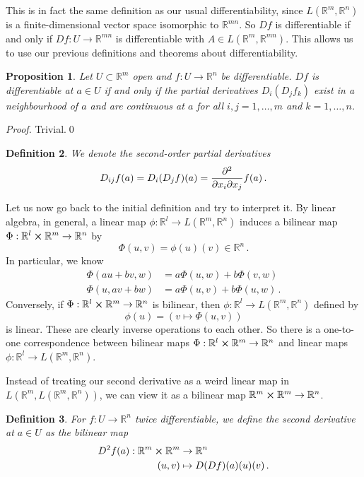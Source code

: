\documentclass{article}
\theoremstyle{plain}\theoremheaderfont{\normalfont\itshape}\theorembodyfont{\rmfamily}\theoremseparator{.}\newtheorem*{rem}{Remark}\newtheorem*{ex}{Example}\newtheorem*{proof}{Proof}\newtheorem*{altp}{Alternative proof}
\theoremstyle{plain}\theoremheaderfont{\normalfont\bfseries}\theorembodyfont{\rmfamily}\theoremseparator{.}\newtheorem{thm}{Theorem}[section]\newtheorem{lem}[thm]{Lemma}\newtheorem{prop}[thm]{Proposition}\newtheorem*{cor}{Corollary}\newtheorem{defn}[thm]{Definition}\newtheorem{clm}[thm]{Claim}\newtheorem{clminproof}{Claim}
\theoremstyle{break}\theoremheaderfont{\normalfont\itshape}\theorembodyfont{\rmfamily}\theoremseparator{.\medskip}\newtheorem*{proofskip}{Proof}\newtheorem*{exs}{Examples}\newtheorem*{rems}{Remarks}
\theoremstyle{break}\theoremheaderfont{\normalfont\bfseries}\theorembodyfont{\rmfamily}\theoremseparator{.\medskip}\newtheorem{lemskip}[thm]{Lemma}\newtheorem{defnskip}[thm]{Definition}\newtheorem{propskip}[thm]{Proposition}\newtheorem{thmskip}[thm]{Theorem}
\newcommand{\qed}{\hfill\ensuremath{\Box}}
\begin{document}
    This is in fact the same definition as our usual differentiability, since \(L(\mathbb{R}^m,\mathbb{R}^n)\) is a finite-dimensional vector space isomorphic to \(\mathbb{R}^{mn}\). So \(Df\) is differentiable if and only if \(Df:U\to\mathbb{R}^{mn}\) is differentiable with \(A\in L(\mathbb{R}^m,\mathbb{R}^{mn})\). This allows us to use our previous definitions and theorems about differentiability.

    \begin{prop}
        Let \(U\subset\mathbb{R}^m\) open and \(f:U\to\mathbb{R}^n\) be differentiable. \(Df\) is differentiable at \(a\in U\) if and only if the partial derivatives \(D_i(D_jf_k)\) exist in a neighbourhood of \(a\) and are continuous at \(a\) for all \(i,j=1,\dots,m\) and \(k=1,\dots,n\).
    \end{prop}
    \begin{proof}
        Trivial.\qed
    \end{proof}
    \begin{defn}
        We denote the \textit{second-order partial derivatives}
        \[D_{ij}f(a)=D_i(D_j f)(a)=\pdv[2]{}{x_i}{x_j} f(a)\,.\]
    \end{defn}

    Let us now go back to the initial definition and try to interpret it. By linear algebra, in general, a linear map \(\phi:\mathbb{R}^l\to L(\mathbb{R}^m,\mathbb{R}^n)\) induces a bilinear map \(\Phi:\mathbb{R}^l\cross\mathbb{R}^m\to\mathbb{R}^n\) by
    \[\Phi(u,v)=\phi(u)(v)\in\mathbb{R}^n\,.\]
    In particular, we know
    \begin{align*}
        \Phi(au+bv,w)&=a\Phi(u,w)+b\Phi(v,w)\\
        \Phi(u,av+bw)&=a\Phi(u,v)+b\Phi(u,w)\,.
    \end{align*}
    Conversely, if \(\Phi:\mathbb{R}^l\cross\mathbb{R}^m\to\mathbb{R}^n\) is bilinear, then \(\phi:\mathbb{R}^l\to L(\mathbb{R}^m,\mathbb{R}^n)\) defined by
    \[\phi(u)=(v\mapsto\Phi(u,v))\]
    is linear. These are clearly inverse operations to each other. So there is a one-to-one correspondence between bilinear maps \(\Phi:\mathbb{R}^l\cross\mathbb{R}^m\to\mathbb{R}^n\) and linear maps \(\phi:\mathbb{R}^l\to L(\mathbb{R}^m,\mathbb{R}^n)\).

    Instead of treating our second derivative as a weird linear map in \(L(\mathbb{R}^m,L(\mathbb{R}^m,\mathbb{R}^n))\), we can view it as a bilinear map \(\mathbb{R}^m\cross\mathbb{R}^m\to\mathbb{R}^n\).
    \begin{defn}
        For \(f:U\to\mathbb{R}^n\) twice differentiable, we define the \textit{second derivative} at \(a\in U\) as the bilinear map
        \begin{align*}
            D^2f(a):\mathbb{R}^m\cross\mathbb{R}^m&\to\mathbb{R}^n\\
            (u,v)&\mapsto D(Df)(a)(u)(v)\,.
        \end{align*}
    \end{defn}
    
\end{document}
